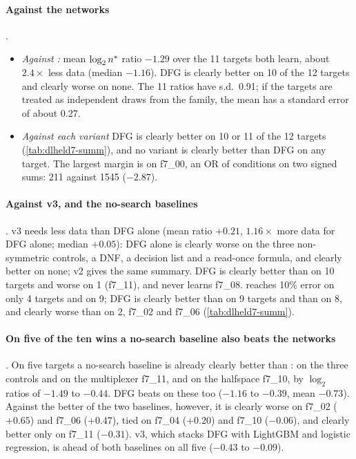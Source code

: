 \paragraph{Against the networks} .
\begin{itemize}
\item \emph{Against :} mean $\log_2n^{*}$ ratio $-1.29$ over the 11 targets both learn, about $2.4\times$ less data (median $-1.16$). DFG is clearly better on 10 of the 12 targets and clearly worse on none. The 11 ratios have s.d.\ 0.91; if the targets are treated as independent draws from the family, the mean has a standard error of about 0.27.
\item \emph{Against each variant} DFG is clearly better on 10 or 11 of the 12 targets (\cref{tab:dlheld7-summ}), and no variant is clearly better than DFG on any target. The largest margin is on f7\_00, an OR of conditions on two signed sums: 211 against 1545 ($-2.87$).
\end{itemize}

\paragraph{Against v3,  and the no-search baselines} . v3 needs less data than DFG alone (mean ratio $+0.21$, $1.16\times$ more data for DFG alone; median $+0.05$): DFG alone is clearly worse on the three non-symmetric controls, a DNF, a decision list and a read-once formula, and clearly better on none; v2 gives the same summary. DFG is clearly better than  on 10 targets and worse on 1 (f7\_11), and  never learns f7\_08.  reaches 10\% error on only 4 targets and  on 9; DFG is clearly better than  on 9 targets and than  on 8, and clearly worse than  on 2, f7\_02 and f7\_06 (\cref{tab:dlheld7-summ}).

\paragraph{On five of the ten wins a no-search baseline also beats the networks} . On five targets a no-search baseline is already clearly better than :  on the three controls and on the multiplexer f7\_11, and  on the halfspace f7\_10, by $\log_2$ ratios of $-1.49$ to $-0.44$. DFG beats  on these too ($-1.16$ to $-0.39$, mean $-0.73$). Against the better of the two baselines, however, it is clearly worse on f7\_02 ($+0.65$) and f7\_06 ($+0.47$), tied on f7\_04 ($+0.20$) and f7\_10 ($-0.06$), and clearly better only on f7\_11 ($-0.31$). v3, which stacks DFG with LightGBM and logistic regression, is ahead of both baselines on all five ($-0.43$ to $-0.09$).

